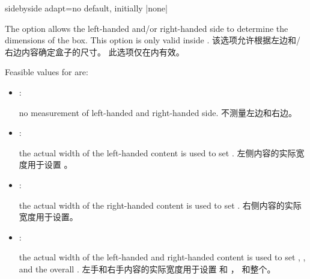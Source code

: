  


\begin{docTcbKey}[][doc new=2015-11-20]{sidebyside adapt}{=}{no default, initially |none|}
\begin{stripedbox}
The option allows the left-handed and/or right-handed side to determine the dimensions of the box. 
This option is only valid inside .
\tcblower
该选项允许根据左边和/右边内容确定盒子的尺寸。
此选项仅在内有效。
\end{stripedbox}

Feasible values for  are:
\begin{itemize}
    \item{}: 
\begin{stripedbox}
no measurement of left-handed and right-handed side.
\tcblower
不测量左边和右边。
\end{stripedbox}
    \item{}:
\begin{stripedbox}
the actual width of the left-handed content is used to set .
\tcblower
左侧内容的实际宽度用于设置 。
\end{stripedbox}
    \item{}:
\begin{stripedbox}
the actual width of the right-handed content is used to set .
\tcblower
右侧内容的实际宽度用于设置。
\end{stripedbox}

    \item{}:
\begin{stripedbox}
the actual width of the left-handed and right-handed content is used to set ,  , and the overall .
\tcblower
左手和右手内容的实际宽度用于设置  和 ，%
和整个。
\end{stripedbox}

\end{itemize}

\begin{dispExample}
\end{dispExample}




\end{docTcbKey}

